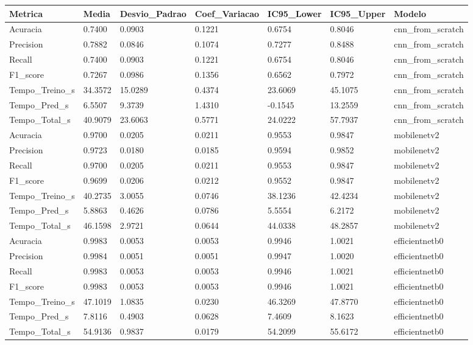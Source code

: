 \begin{tabular}{lllllll}
\toprule
Metrica & Media & Desvio_Padrao & Coef_Variacao & IC95_Lower & IC95_Upper & Modelo \\
\midrule
Acuracia & 0.7400 & 0.0903 & 0.1221 & 0.6754 & 0.8046 & cnn_from_scratch \\
Precision & 0.7882 & 0.0846 & 0.1074 & 0.7277 & 0.8488 & cnn_from_scratch \\
Recall & 0.7400 & 0.0903 & 0.1221 & 0.6754 & 0.8046 & cnn_from_scratch \\
F1_score & 0.7267 & 0.0986 & 0.1356 & 0.6562 & 0.7972 & cnn_from_scratch \\
Tempo_Treino_s & 34.3572 & 15.0289 & 0.4374 & 23.6069 & 45.1075 & cnn_from_scratch \\
Tempo_Pred_s & 6.5507 & 9.3739 & 1.4310 & -0.1545 & 13.2559 & cnn_from_scratch \\
Tempo_Total_s & 40.9079 & 23.6063 & 0.5771 & 24.0222 & 57.7937 & cnn_from_scratch \\
Acuracia & 0.9700 & 0.0205 & 0.0211 & 0.9553 & 0.9847 & mobilenetv2 \\
Precision & 0.9723 & 0.0180 & 0.0185 & 0.9594 & 0.9852 & mobilenetv2 \\
Recall & 0.9700 & 0.0205 & 0.0211 & 0.9553 & 0.9847 & mobilenetv2 \\
F1_score & 0.9699 & 0.0206 & 0.0212 & 0.9552 & 0.9847 & mobilenetv2 \\
Tempo_Treino_s & 40.2735 & 3.0055 & 0.0746 & 38.1236 & 42.4234 & mobilenetv2 \\
Tempo_Pred_s & 5.8863 & 0.4626 & 0.0786 & 5.5554 & 6.2172 & mobilenetv2 \\
Tempo_Total_s & 46.1598 & 2.9721 & 0.0644 & 44.0338 & 48.2857 & mobilenetv2 \\
Acuracia & 0.9983 & 0.0053 & 0.0053 & 0.9946 & 1.0021 & efficientnetb0 \\
Precision & 0.9984 & 0.0051 & 0.0051 & 0.9947 & 1.0020 & efficientnetb0 \\
Recall & 0.9983 & 0.0053 & 0.0053 & 0.9946 & 1.0021 & efficientnetb0 \\
F1_score & 0.9983 & 0.0053 & 0.0053 & 0.9946 & 1.0021 & efficientnetb0 \\
Tempo_Treino_s & 47.1019 & 1.0835 & 0.0230 & 46.3269 & 47.8770 & efficientnetb0 \\
Tempo_Pred_s & 7.8116 & 0.4903 & 0.0628 & 7.4609 & 8.1623 & efficientnetb0 \\
Tempo_Total_s & 54.9136 & 0.9837 & 0.0179 & 54.2099 & 55.6172 & efficientnetb0 \\

\end{tabular}
